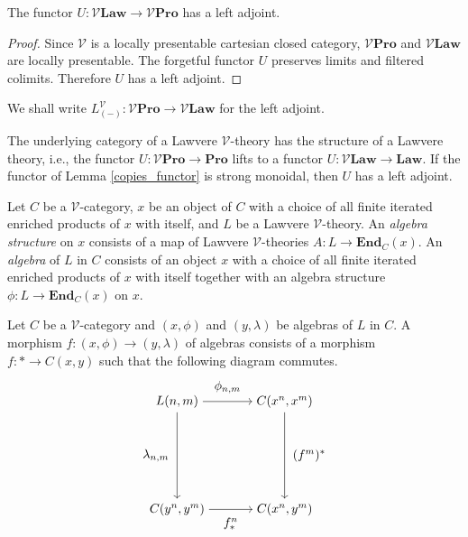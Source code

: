 \documentclass{tac}
\begin{document}
\begin{proposition}
The functor $U:\mathcal{V}\mathbf{Law}\to\mathcal{V}\mathbf{Pro}$ has a left adjoint.
\end{proposition}

\begin{proof}
Since $\mathcal{V}$ is a locally presentable cartesian closed category, $\mathcal{V}\mathbf{Pro}$ and $\mathcal{V}\mathbf{Law}$ are locally presentable. The forgetful functor $U$ preserves limits and filtered colimits. Therefore $U$ has a left adjoint.
\end{proof}

We shall write $L_{(-)}^\mathcal{V}:\mathcal{V}\mathbf{Pro}\to\mathcal{V}\mathbf{Law}$ for the left adjoint.

\begin{proposition}
The underlying category of a Lawvere $\mathcal{V}$-theory has the structure of a Lawvere theory, i.e., the functor $U:\mathcal{V}\mathbf{Pro}\to\mathbf{Pro}$ lifts to a functor $U:\mathcal{V}\mathbf{Law}\to\mathbf{Law}$.  If the functor of Lemma \ref{copies_functor} is strong monoidal, then $U$ has a left adjoint.
\end{proposition}

\begin{definition}
Let $C$ be a $\mathcal{V}$-category, $x$ be an object of $C$ with a choice of all finite iterated enriched products of $x$ with itself, and $L$ be a Lawvere $\mathcal{V}$-theory. An \emph{algebra structure} on $x$ consists of a map of Lawvere $\mathcal{V}$-theories $A:L\to \mathbf{End}_C(x)$. An \emph{algebra} of $L$ in $C$ consists of an object $x$ with a choice of all finite iterated enriched products of $x$ with itself together with an algebra structure $\phi:L\to \mathbf{End}_C(x)$ on $x$.
\end{definition}

\begin{definition}
Let $C$ be a $\mathcal{V}$-category and $(x,\phi)$ and $(y,\lambda)$ be algebras of $L$ in $C$. A morphism $f:(x,\phi)\to(y,\lambda)$ of algebras consists of a morphism $f:*\to C(x,y)$ such that the following diagram commutes.
\[
\begin{tikzpicture}[node distance=3cm]
    \node (A) {$L(n,m)$};
    \node (B)[right of=A]{$C(x^n,x^m)$};
    \node (C)[below of=A]{$C(y^n,y^m)$};
    \node (D)[right of=C]{$C(x^n,y^m)$};
    \draw[->](A) to node[above=3]{$\phi_{n,m}$}(B);
    \draw[->](A) to node[left=3]{$\lambda_{n,m}$}(C);
    \draw[->](B) to node[right=3]{$(f^m)^*$}(D);
    \draw[->](C) to node[below=3]{$f^n_*$}(D);
\end{tikzpicture}
\]
\end{definition}
\end{document}
